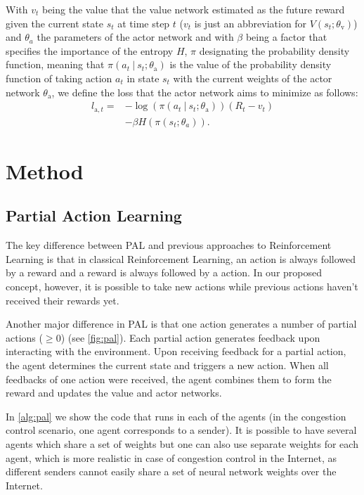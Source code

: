 \documentclass[sigconf]{acmart}
\newcommand\givenbase[1][]{\:#1\lvert\:}
\let\given\givenbase
\begin{document}
With $v_t$ being the value that the value network estimated as the future reward given the current state $s_t$ at time step $t$ ($v_t$ is just an abbreviation for $V(s_t; \theta_\text{v})$) and $\theta_a$ the parameters of the actor network and with $\beta$ being a factor that specifies the importance of the entropy $H$, $\pi$ designating the probability density function, meaning that $\pi\left( a_t \given s_t; \theta_\text{a} \right)$ is the value of the probability density function of taking action $a_t$ in state $s_t$ with the current weights of the actor network $\theta_\text{a}$, we define the loss that the actor network aims to minimize as follows:
\begin{align*}
l_{\text{a},t} =& -\log \left( \pi\left( a_t \given s_t; \theta_\text{a} \right)\right)\left( R_t - v_t \right)\\ 
&- \beta H\left( \pi\left( s_t; \theta_a \right)\right).
\end{align*}

\section{Method}
\subsection{Partial Action Learning}
\label{subsec:pal}

The key difference between PAL and previous approaches to Reinforcement Learning is that in classical Reinforcement Learning, an action is always followed by a reward and a reward is always followed by a action. In our proposed concept, however, it is possible to take new actions while previous actions haven't received their rewards yet.

Another major difference in PAL is that one action generates a number of partial actions ($\geq 0$) (see \autoref{fig:pal}). Each partial action generates feedback upon interacting with the environment. Upon receiving feedback for a partial action, the agent determines the current state and triggers a new action. When all feedbacks of one action were received, the agent combines them to form the reward and updates the value and actor networks.

In \autoref{alg:pal} we show the code that runs in each of the agents (in the congestion control scenario, one agent corresponds to a sender). It is possible to have several agents which share a set of weights but one can also use separate weights for each agent, which is more realistic in case of congestion control in the Internet, as different senders cannot easily share a set of neural network weights over the Internet.
\end{document}
